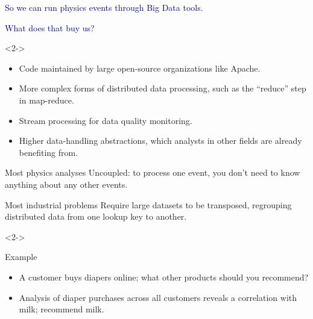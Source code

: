 \documentclass{beamer}
\begin{document}
\begin{frame}{}
\vfill
\textcolor{darkblue}{\Large So we can run physics events through Big Data \mbox{tools.\hspace{-1 cm}}}

\vspace{0.3 cm}
\textcolor{darkblue}{\Large What does that buy us?}

\begin{uncoverenv}<2->
\begin{itemize}\setlength{\itemsep}{0.2 cm}
\item Code maintained by large open-source organizations like Apache.
\item More complex forms of distributed data processing, such as the ``reduce'' step in map-reduce.
\item Stream processing for data quality monitoring.
\item Higher data-handling abstractions, which analysts in other fields are already benefiting from.
\end{itemize}
\end{uncoverenv}
\end{frame}

\begin{frame}{}

\begin{block}{Most physics analyses}
Uncoupled: to process one event, you don't need to know anything about any other events.
\end{block}

\begin{block}{Most industrial problems}
Require large datasets to be transposed, regrouping distributed data from one lookup key to another.
\end{block}

\begin{uncoverenv}<2->
\begin{block}{Example}
\begin{itemize}
\item A customer buys diapers online; what other products should you recommend?
\item Analysis of diaper purchases across all customers reveals a correlation with milk; recommend milk.
\end{itemize}
\end{block}
\end{uncoverenv}
\end{frame}
\end{document}

